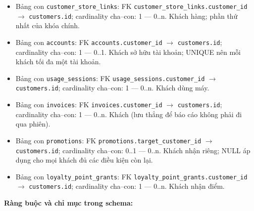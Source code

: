 \begin{itemize}

\item Bảng con \texttt{customer\_store\_links}: FK \texttt{customer\_store\_links.customer\_id} $\rightarrow$ \texttt{customers.id}; cardinality cha--con: 1 — 0..n. Khách hàng; phần thứ nhất của khóa chính.

\item Bảng con \texttt{accounts}: FK \texttt{accounts.customer\_id} $\rightarrow$ \texttt{customers.id}; cardinality cha--con: 1 — 0..1. Khách sở hữu tài khoản; UNIQUE nên mỗi khách tối đa một tài khoản.

\item Bảng con \texttt{usage\_sessions}: FK \texttt{usage\_sessions.customer\_id} $\rightarrow$ \texttt{customers.id}; cardinality cha--con: 1 — 0..n. Khách dùng máy.

\item Bảng con \texttt{invoices}: FK \texttt{invoices.customer\_id} $\rightarrow$ \texttt{customers.id}; cardinality cha--con: 1 — 0..n. Khách (lưu thẳng để báo cáo không phải đi qua phiên).

\item Bảng con \texttt{promotions}: FK \texttt{promotions.target\_customer\_id} $\rightarrow$ \texttt{customers.id}; cardinality cha--con: 0..1 — 0..n. Khách nhận riêng; NULL áp dụng cho mọi khách đủ các điều kiện còn lại.

\item Bảng con \texttt{loyalty\_point\_grants}: FK \texttt{loyalty\_point\_grants.customer\_id} $\rightarrow$ \texttt{customers.id}; cardinality cha--con: 1 — 0..n. Khách nhận điểm.

\end{itemize}

\textbf{Ràng buộc và chỉ mục trong schema:}

